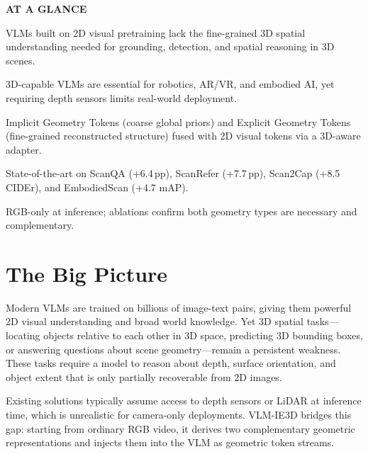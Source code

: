 \documentclass[10pt,twocolumn]{article}
\begin{document}
\begin{mdframed}[backgroundcolor=boxgray,linecolor=rulered,linewidth=1pt,
    innerleftmargin=6pt,innerrightmargin=6pt,
    innertopmargin=6pt,innerbottommargin=6pt]
\textbf{\small AT A GLANCE}\par\vspace{4pt}
\begin{description}[leftmargin=0pt,labelsep=4pt,itemsep=2pt,parsep=0pt,
    font=\small\bfseries]
  \item[Problem:] VLMs built on 2D visual pretraining lack the
    fine-grained 3D spatial understanding needed for grounding,
    detection, and spatial reasoning in 3D scenes.
  \item[Why it matters:] 3D-capable VLMs are essential for robotics,
    AR/VR, and embodied AI, yet requiring depth sensors limits real-world
    deployment.
  \item[Method:] Implicit Geometry Tokens (coarse global priors) and
    Explicit Geometry Tokens (fine-grained reconstructed structure)
    fused with 2D visual tokens via a 3D-aware adapter.
  \item[Result:] State-of-the-art on ScanQA (+6.4\,pp), ScanRefer
    (+7.7\,pp), Scan2Cap (+8.5 CIDEr), and EmbodiedScan (+4.7 mAP).
  \item[Evidence:] RGB-only at inference; ablations confirm both
    geometry types are necessary and complementary.
\end{description}
\end{mdframed}

\section{The Big Picture}

Modern VLMs are trained on billions of image-text pairs, giving them
powerful 2D visual understanding and broad world knowledge. Yet 3D
spatial tasks---locating objects relative to each other in 3D space,
predicting 3D bounding boxes, or answering questions about scene
geometry---remain a persistent weakness. These tasks require a model
to reason about depth, surface orientation, and object extent that
is only partially recoverable from 2D images.

Existing solutions typically assume access to depth sensors or
LiDAR at inference time, which is unrealistic for camera-only
deployments. VLM-IE3D bridges this gap: starting from ordinary RGB
video, it derives two complementary geometric representations and
injects them into the VLM as geometric token streams.
\end{document}
